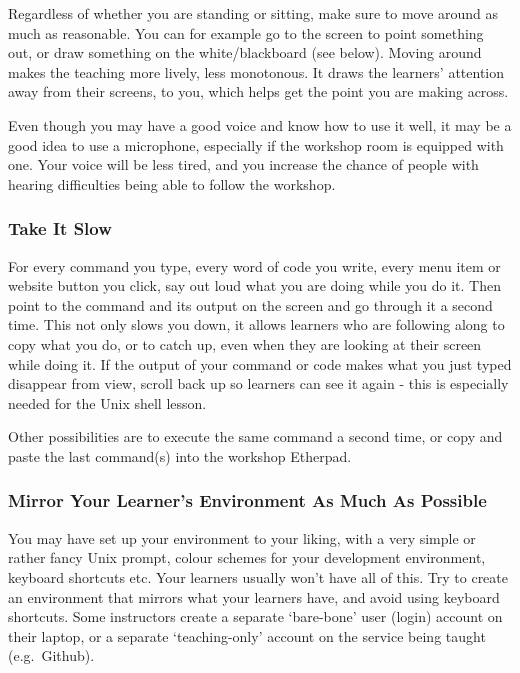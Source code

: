 Regardless of whether you are standing or sitting, make sure to move
around as much as reasonable. You can for example go to the screen to
point something out, or draw something on the white/blackboard (see
below). Moving around makes the teaching more lively, less monotonous.
It draws the learners' attention away from their screens, to you, which
helps get the point you are making across.

Even though you may have a good voice and know how to use it well, it
may be a good idea to use a microphone, especially if the workshop room
is equipped with one. Your voice will be less tired, and you increase
the chance of people with hearing difficulties being able to follow the
workshop.

\subsubsection{Take It Slow}\label{take-it-slow}

For every command you type, every word of code you write, every menu
item or website button you click, say out loud what you are doing while
you do it. Then point to the command and its output on the screen and go
through it a second time. This not only slows you down, it allows
learners who are following along to copy what you do, or to catch up,
even when they are looking at their screen while doing it. If the output
of your command or code makes what you just typed disappear from view,
scroll back up so learners can see it again - this is especially needed
for the Unix shell lesson.

Other possibilities are to execute the same command a second time, or
copy and paste the last command(s) into the workshop Etherpad.

\subsubsection{Mirror Your Learner's Environment As Much As
Possible}\label{mirror-your-learners-environment-as-much-as-possible}

You may have set up your environment to your liking, with a very simple
or rather fancy Unix prompt, colour schemes for your development
environment, keyboard shortcuts etc. Your learners usually won't have
all of this. Try to create an environment that mirrors what your
learners have, and avoid using keyboard shortcuts. Some instructors
create a separate `bare-bone' user (login) account on their laptop, or a
separate `teaching-only' account on the service being taught
(e.g.~Github).

